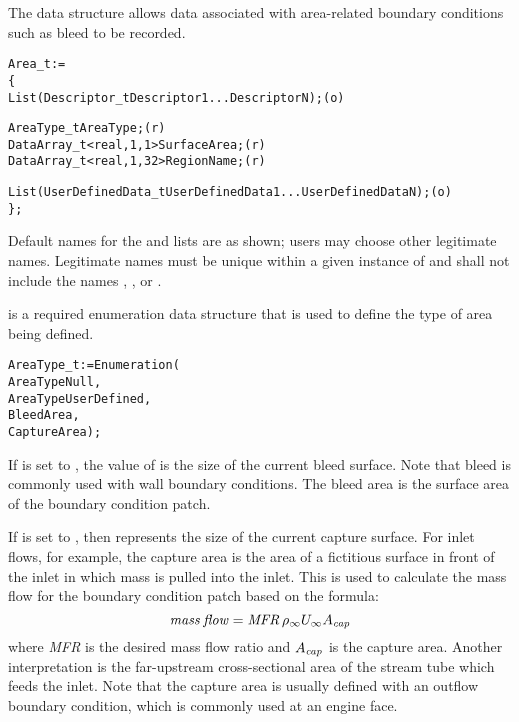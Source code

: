 The  data structure allows data associated with
area-related boundary conditions such as bleed to be recorded.

\begin{alltt}
  Area\_t :=
    \{
    List( Descriptor\_t  Descriptor1 ... DescriptorN ) ;                     (o)

    AreaType\_t AreaType ;                                                   (r)
    DataArray\_t<real, 1, 1>  SurfaceArea ;                                  (r)
    DataArray\_t<real, 1, 32> RegionName ;                                   (r)

    List( UserDefinedData\_t UserDefinedData1 ... UserDefinedDataN ) ;       (o)
    \} ;
\end{alltt}

\begin{notes}
\item
 Default names for the  and 
 lists are as shown; users may choose other legitimate names.
 Legitimate names must be unique within a given instance of
  and shall not include the names ,
 , or .
\end{notes}

 is a required enumeration data structure
that is used to define the type of area being defined.
\begin{alltt}
  AreaType\_t := Enumeration(
    AreaTypeNull,
    AreaTypeUserDefined,
    BleedArea,
    CaptureArea ) ;
\end{alltt}

If  is set to , the value of
 is the size of the current bleed surface.
Note that bleed is commonly used with wall boundary conditions.
The bleed area is the surface area of the boundary condition patch.

If  is set to , then
 represents the size of the current capture surface.
For inlet flows, for example, the capture area is the area of a
fictitious surface in front of the inlet in which mass is pulled into
the inlet.
This is used to calculate the mass flow for the boundary condition patch
based on the formula:
$$
{\it mass\:flow} = {\it MFR} \, \rho_{\infty} U_{\infty} A_{\it cap}
$$
where \textit{MFR} is the desired mass flow ratio and
$A_{\it cap}$ is the capture area.
Another interpretation is the far-upstream cross-sectional area of the
stream tube which feeds the inlet.
Note that the capture area is usually defined with an outflow boundary
condition, which is commonly used at an engine face.

